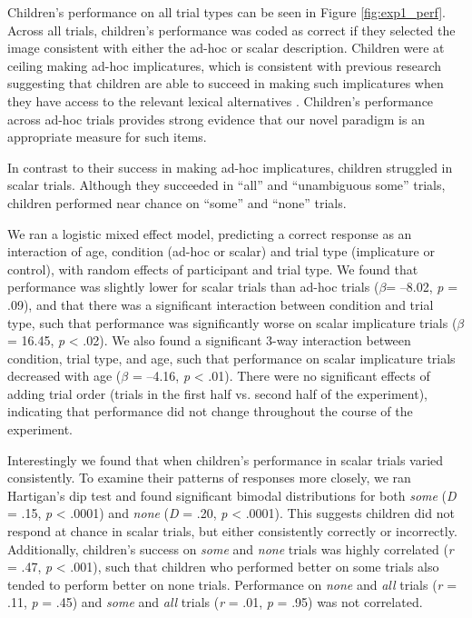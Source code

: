 \documentclass[man]{apa2}
\begin{document}
Children's performance on all trial types can be seen in Figure \ref{fig:exp1_perf}. Across all trials, children's performance was coded as correct if they selected the image consistent with either the ad-hoc or scalar description. Children were at ceiling making ad-hoc implicatures, which is consistent with previous research suggesting that children are able to succeed in making such implicatures when they have access to the relevant lexical alternatives \cite{Stiller2014}. Children's performance across ad-hoc trials provides strong evidence that our novel paradigm is an appropriate measure for such items.

In contrast to their success in making ad-hoc implicatures, children struggled in scalar trials. Although they succeeded in ``all'' and ``unambiguous some'' trials, children performed near chance on ``some'' and ``none'' trials. 

We ran a logistic mixed effect model, predicting a correct response as an interaction of age, condition (ad-hoc or scalar) and trial type (implicature or control), with random effects of participant and trial type. We found that performance was slightly lower for scalar trials than ad-hoc trials ($\beta$= --8.02, \textit{p} = .09), and that there was a significant interaction between condition and trial type, such that performance was significantly worse on scalar implicature trials ($\beta$= 16.45, \textit{p} < .02). We also found a significant 3-way interaction between condition, trial type, and age, such that performance on scalar implicature trials decreased with age ($\beta$ = --4.16, \textit{p} < .01). There were no significant effects of adding trial order (trials in the first half vs. second half of the experiment), indicating that performance did not change throughout the course of the experiment. 

Interestingly we found that when children's performance in scalar trials varied consistently. To examine their patterns of responses more closely, we ran Hartigan's dip test and found significant bimodal distributions for both \textit{some} (\textit{D} = .15, \textit{p} < .0001) and \textit{none} (\textit{D} = .20, \textit{p} < .0001). This suggests children did not respond at chance in scalar trials, but either consistently correctly or incorrectly. Additionally, children's success on \textit{some} and \textit{none} trials was highly correlated (\textit{r} = .47, \textit{p} < .001), such that children who performed better on some trials also tended to perform better on none trials.  Performance on \textit{none} and \textit{all} trials (\textit{r} = .11, \textit{p} = .45) and \textit{some} and \textit{all} trials (\textit{r} = .01, \textit{p} = .95) was not correlated. 
\end{document}
